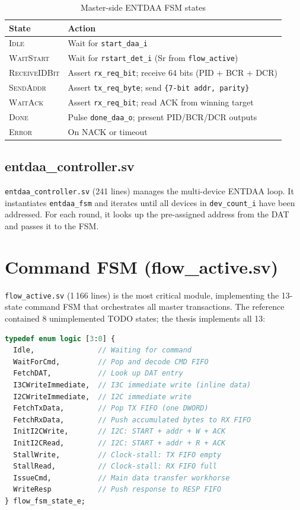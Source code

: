 \documentclass[12pt, a4paper, oneside]{report}
\newcommand{\signal}[1]{\texttt{#1}}
\newcommand{\file}[1]{\texttt{#1}}
\newcommand{\module}[1]{\texttt{#1}}
\newcommand{\state}[1]{\textsc{#1}}
\begin{document}
\begin{table}[H]
\centering
\caption{Master-side ENTDAA FSM states}
\label{tab:entdaa_states}
\begin{tabularx}{\textwidth}{L{3cm} L{9.5cm}}
\toprule
\textbf{State} & \textbf{Action} \\
\midrule
\state{Idle}        & Wait for \signal{start\_daa\_i} \\
\state{WaitStart}   & Wait for \signal{rstart\_det\_i} (Sr from \module{flow\_active}) \\
\state{ReceiveIDBit}& Assert \signal{rx\_req\_bit}; receive 64 bits (PID + BCR + DCR) \\
\state{SendAddr}    & Assert \signal{tx\_req\_byte}; send \texttt{\{7-bit addr, parity\}} \\
\state{WaitAck}     & Assert \signal{rx\_req\_bit}; read ACK from winning target \\
\state{Done}        & Pulse \signal{done\_daa\_o}; present PID/BCR/DCR outputs \\
\state{Error}       & On NACK or timeout \\
\bottomrule
\end{tabularx}
\end{table}

\subsection{entdaa\_controller.sv}

\file{entdaa\_controller.sv} (241 lines) manages the multi-device ENTDAA loop.
It instantiates \module{entdaa\_fsm} and iterates until all devices in
\signal{dev\_count\_i} have been addressed. For each round, it looks up the
pre-assigned address from the DAT and passes it to the FSM.

\section{Command FSM (flow\_active.sv)}

\file{flow\_active.sv} (1\,166 lines) is the most critical module, implementing
the 13-state command FSM that orchestrates all master transactions. The reference
contained 8 unimplemented TODO states; the thesis implements all 13:

\begin{lstlisting}[language=SystemVerilog, caption={flow\_active FSM state enumeration}]
typedef enum logic [3:0] {
  Idle,               // Waiting for command
  WaitForCmd,         // Pop and decode CMD FIFO
  FetchDAT,           // Look up DAT entry
  I3CWriteImmediate,  // I3C immediate write (inline data)
  I2CWriteImmediate,  // I2C immediate write
  FetchTxData,        // Pop TX FIFO (one DWORD)
  FetchRxData,        // Push accumulated bytes to RX FIFO
  InitI2CWrite,       // I2C: START + addr + W + ACK
  InitI2CRead,        // I2C: START + addr + R + ACK
  StallWrite,         // Clock-stall: TX FIFO empty
  StallRead,          // Clock-stall: RX FIFO full
  IssueCmd,           // Main data transfer workhorse
  WriteResp           // Push response to RESP FIFO
} flow_fsm_state_e;
\end{lstlisting}
\end{document}
